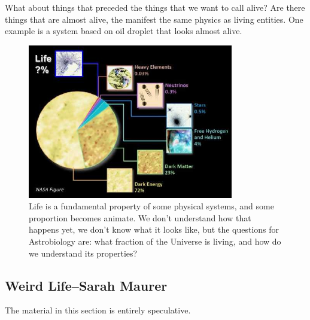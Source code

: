 \documentclass[]{article}
\begin{document}
What about things that preceded the things that we want to call alive? Are there things that are almost alive, the manifest the same physics as living entities. One example is a system based on oil droplet that looks almost alive.\cite{Points885}

\begin{figure}[H]
	\caption[what fraction of the Universe is living?]{Life is a fundamental property of some physical systems, and some proportion becomes animate. We don't understand how that happens yet, we don't know what it looks like, but the questions for Astrobiology are: what fraction of the Universe is living, and how do we understand its properties?}\label{figs:the-big-picture}
	\includegraphics[width=0.8\textwidth]{the-big-picture}
\end{figure}

\subsection[Weird Life]{Weird Life--Sarah Maurer}

The material in this section is entirely speculative.
\end{document}
